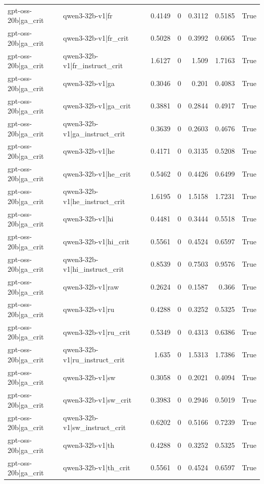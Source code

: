\begin{table}
\begin{tabular}{l l r r r r l}
gpt-oss-20b|ga_crit & qwen3-32b-v1|fr & 0.4149 & 0 & 0.3112 & 0.5185 & True \\
gpt-oss-20b|ga_crit & qwen3-32b-v1|fr_crit & 0.5028 & 0 & 0.3992 & 0.6065 & True \\
gpt-oss-20b|ga_crit & qwen3-32b-v1|fr_instruct_crit & 1.6127 & 0 & 1.509 & 1.7163 & True \\
gpt-oss-20b|ga_crit & qwen3-32b-v1|ga & 0.3046 & 0 & 0.201 & 0.4083 & True \\
gpt-oss-20b|ga_crit & qwen3-32b-v1|ga_crit & 0.3881 & 0 & 0.2844 & 0.4917 & True \\
gpt-oss-20b|ga_crit & qwen3-32b-v1|ga_instruct_crit & 0.3639 & 0 & 0.2603 & 0.4676 & True \\
gpt-oss-20b|ga_crit & qwen3-32b-v1|he & 0.4171 & 0 & 0.3135 & 0.5208 & True \\
gpt-oss-20b|ga_crit & qwen3-32b-v1|he_crit & 0.5462 & 0 & 0.4426 & 0.6499 & True \\
gpt-oss-20b|ga_crit & qwen3-32b-v1|he_instruct_crit & 1.6195 & 0 & 1.5158 & 1.7231 & True \\
gpt-oss-20b|ga_crit & qwen3-32b-v1|hi & 0.4481 & 0 & 0.3444 & 0.5518 & True \\
gpt-oss-20b|ga_crit & qwen3-32b-v1|hi_crit & 0.5561 & 0 & 0.4524 & 0.6597 & True \\
gpt-oss-20b|ga_crit & qwen3-32b-v1|hi_instruct_crit & 0.8539 & 0 & 0.7503 & 0.9576 & True \\
gpt-oss-20b|ga_crit & qwen3-32b-v1|raw & 0.2624 & 0 & 0.1587 & 0.366 & True \\
gpt-oss-20b|ga_crit & qwen3-32b-v1|ru & 0.4288 & 0 & 0.3252 & 0.5325 & True \\
gpt-oss-20b|ga_crit & qwen3-32b-v1|ru_crit & 0.5349 & 0 & 0.4313 & 0.6386 & True \\
gpt-oss-20b|ga_crit & qwen3-32b-v1|ru_instruct_crit & 1.635 & 0 & 1.5313 & 1.7386 & True \\
gpt-oss-20b|ga_crit & qwen3-32b-v1|sw & 0.3058 & 0 & 0.2021 & 0.4094 & True \\
gpt-oss-20b|ga_crit & qwen3-32b-v1|sw_crit & 0.3983 & 0 & 0.2946 & 0.5019 & True \\
gpt-oss-20b|ga_crit & qwen3-32b-v1|sw_instruct_crit & 0.6202 & 0 & 0.5166 & 0.7239 & True \\
gpt-oss-20b|ga_crit & qwen3-32b-v1|th & 0.4288 & 0 & 0.3252 & 0.5325 & True \\
gpt-oss-20b|ga_crit & qwen3-32b-v1|th_crit & 0.5561 & 0 & 0.4524 & 0.6597 & True \\

\end{tabular}
\end{table}

